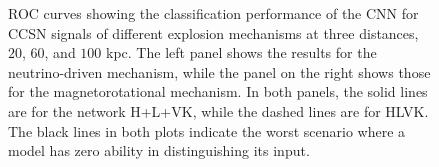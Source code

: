 \documentclass[aps,twocolumn,showpacs,groupedaddress, nofootinbib]{revtex4}  %
\begin{document}
\begin{figure}
     \begin{center}
        \quad
    \end{center}
    \caption{\ac{ROC} curves showing the classification performance of the
\ac{CNN} for \ac{CCSN} signals of different explosion mechanisms at three
distances, $20$, $60$, and $100$ kpc. The left panel shows the results for the
neutrino-driven mechanism, while the panel on the right shows those for the
magnetorotational mechanism. In both panels, the solid lines are for the
network H+L+VK, while the dashed lines are for HLVK. The black lines in both plots indicate 
the worst scenario where a model has zero ability in distinguishing its input.
\label{fig:ROClog}} 
\end{figure}
\end{document}
